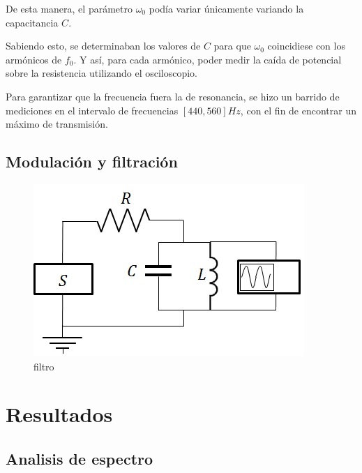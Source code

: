 \documentclass[11pt,a4paper]{article}
\begin{document}
De esta manera, el parámetro $\omega_0$ podía variar únicamente variando la capacitancia $C$.

Sabiendo esto, se determinaban los valores de $C$ para que $\omega_0$ coincidiese con los armónicos de $f_0$. Y así, para cada armónico, poder medir la caída de potencial sobre la resistencia utilizando el osciloscopio. 

Para garantizar que la frecuencia fuera la de resonancia, se hizo un barrido de mediciones en el intervalo de frecuencias $[440,560] Hz$, con el fin de encontrar un máximo de transmisión.


\subsection{Modulación y filtración}



\begin{figure}[h]
\centering
\includegraphics[scale=0.8]{filtro}
\caption{filtro}
\label{fig:filtro}
\end{figure}




\section{Resultados}
\label{sec:discusion}

\subsection{Analisis de espectro}
\end{document}
